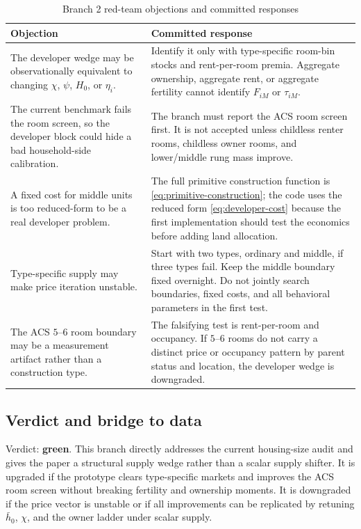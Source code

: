 \documentclass[11pt]{article}
\begin{document}
\begin{table}[!ht]
\centering
\caption{Branch 2 red-team objections and committed responses}
\begin{tabular}{p{}p{}}
\toprule
Objection & Committed response \\
\midrule
The developer wedge may be observationally equivalent to changing $\chi$, $\psi$, $H_0$, or $\eta_i$. & Identify it only with type-specific room-bin stocks and rent-per-room premia. Aggregate ownership, aggregate rent, or aggregate fertility cannot identify $F_{iM}$ or $\tau_{iM}$. \\
The current benchmark fails the room screen, so the developer block could hide a bad household-side calibration. & The branch must report the ACS room screen first. It is not accepted unless childless renter rooms, childless owner rooms, and lower/middle rung mass improve. \\
A fixed cost for middle units is too reduced-form to be a real developer problem. & The full primitive construction function is \eqref{eq:primitive-construction}; the code uses the reduced form \eqref{eq:developer-cost} because the first implementation should test the economics before adding land allocation. \\
Type-specific supply may make price iteration unstable. & Start with two types, ordinary and middle, if three types fail. Keep the middle boundary fixed overnight. Do not jointly search boundaries, fixed costs, and all behavioral parameters in the first test. \\
The ACS $5$--$6$ room boundary may be a measurement artifact rather than a construction type. & The falsifying test is rent-per-room and occupancy. If $5$--$6$ rooms do not carry a distinct price or occupancy pattern by parent status and location, the developer wedge is downgraded. \\
\bottomrule
\end{tabular}
\end{table}

\subsection{Verdict and bridge to data}

Verdict: \textbf{green}. This branch directly addresses the current housing-size audit and gives the paper a structural supply wedge rather than a scalar supply shifter. It is upgraded if the prototype clears type-specific markets and improves the ACS room screen without breaking fertility and ownership moments. It is downgraded if the price vector is unstable or if all improvements can be replicated by retuning $\bar h_0$, $\chi$, and the owner ladder under scalar supply.
\end{document}
